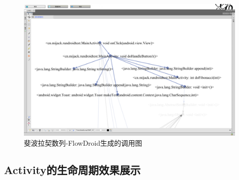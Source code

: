 \begin{figure}[ht]
\centering
\includegraphics[width=\textwidth]{./Figures/FlowDroid-Fibonacci.png}
\caption{斐波拉契数列-FlowDroid生成的调用图}
\label{fig:flowdroid-result-Fibonacci}
\end{figure}

\subsection{Activity的生命周期效果展示}



